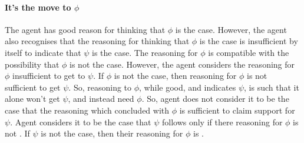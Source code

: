 \paragraph{It's the move to \(\phi\)}

\begin{note}
  The agent has good reason for thinking that \(\phi\) is the case.
  However, the agent also recognises that the reasoning for thinking that \(\phi\) is the case is insufficient by itself to indicate that \(\psi\) is the case.
  The reasoning for \(\phi\) is compatible with the possibility that \(\phi\) is not the case.
  However, the agent considers the reasoning for \(\phi\) insufficient to get to \(\psi\).
  If \(\phi\) is not the case, then reasoning for \(\phi\) is not sufficient to get \(\psi\).
  So, reasoning to \(\phi\), while good, and indicates \(\psi\), is such that it alone won't get \(\psi\), and instead need \(\phi\).
  So, agent does not consider it to be the case that the reasoning which concluded with \(\phi\) is sufficient to claim support for \(\psi\).
  Agent considers it to be the case that \(\psi\) follows only if there reasoning for \(\phi\) is not \misled{}.
  If \(\psi\) is not the case, then their reasoning for \(\phi\) is \misled{}.
\end{note}

